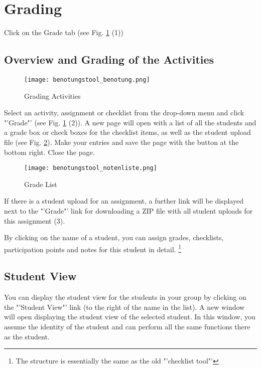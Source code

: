 \section{Grading}
\label{benotung}
Click on the Grade tab (see Fig. \ref{benotung_uebungen} (1))

\subsection{Overview and Grading of the Activities}
\label{ben}

\begin{figure}[ht]
\begin{center}
\texttt{[image: benotungstool\_benotung.png]}
\end{center}
\caption{Grading Activities}\label{benotung_uebungen}
\end{figure}

Select an activity, assignment or checklist from the drop-down menu and click "'Grade"' (see Fig. \ref{benotung_uebungen} (2)).
A new page will open with a list of all the students and a grade box or check boxes for the checklist items, as well as the student upload file (see Fig. \ref {notenliste}).
Make your entries and save the page with the button at the bottom right. Close the page.

\begin{figure}[ht]
\begin{center}
\texttt{[image: benotungstool\_notenliste.png]}
\end{center}
\caption{Grade List}\label{notenliste}
\end{figure}


If there is a student upload for an assignment, a further link will be displayed next to the "'Grade"' link for downloading a ZIP file with all student uploads for this assignment (3).

By clicking on the name of a student, you can assign grades, checklists, participation points and notes for this student in detail. \footnote{The structure is essentially the same as the old "'checklist tool"'}

\subsection{Student View}
\label{studentenansicht}
You can display the student view for the students in your group by clicking on the "'Student View"' link (to the right of the name in the list). A new window will open displaying the student view of the selected student. In this window, you assume the identity of the student and can perform all the same functions there as the student. 

